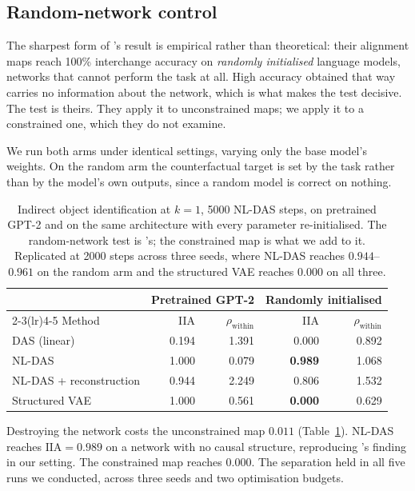 \documentclass{article}
\newcommand{\IIA}{\mathrm{IIA}}
\begin{document}
\subsection{Random-network control}
\label{sec:randomnet}

The sharpest form of \citet{sutter2025nonlinear}'s result is empirical rather
than theoretical: their alignment maps reach 100\% interchange accuracy on
\emph{randomly initialised} language models, networks that cannot perform the
task at all. High accuracy obtained that way carries no information about the
network, which is what makes the test decisive. The test is theirs. They apply it
to unconstrained maps; we apply it to a constrained one, which they do not
examine.

We run both arms under identical settings, varying only the base model's weights.
On the random arm the counterfactual target is set by the task rather than by the
model's own outputs, since a random model is correct on nothing.

\begin{table}[t]
\centering
\small
\setlength{\tabcolsep}{5pt}
\begin{tabular}{l rr rr}
\toprule
& \multicolumn{2}{c}{Pretrained GPT-2} & \multicolumn{2}{c}{Randomly initialised} \\
\cmidrule(lr){2-3}\cmidrule(lr){4-5}
Method & IIA & $\rho_\text{within}$ & IIA & $\rho_\text{within}$ \\
\midrule
DAS (linear)            & 0.194 & 1.391 & 0.000 & 0.892 \\
NL-DAS                  & 1.000 & 0.079 & \textbf{0.989} & 1.068 \\
NL-DAS + reconstruction & 0.944 & 2.249 & 0.806 & 1.532 \\
Structured VAE          & 1.000 & 0.561 & \textbf{0.000} & 0.629 \\
\bottomrule
\end{tabular}
\caption{Indirect object identification at $k = 1$, 5000 NL-DAS steps, on
pretrained GPT-2 and on the same architecture with every parameter
re-initialised. The random-network test is \citet{sutter2025nonlinear}'s; the
constrained map is what we add to it. Replicated at 2000 steps across three
seeds, where NL-DAS reaches $0.944$--$0.961$ on the random arm and the structured
VAE reaches $0.000$ on all three.}
\label{tab:randomnet}
\end{table}

Destroying the network costs the unconstrained map $0.011$
(Table~\ref{tab:randomnet}). NL-DAS reaches $\IIA = 0.989$ on a network with no
causal structure, reproducing \citeauthor{sutter2025nonlinear}'s finding in our
setting. The constrained map reaches $0.000$. The separation held in all five
runs we conducted, across three seeds and two optimisation budgets.
\end{document}
